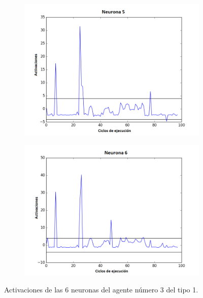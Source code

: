 \begin{figure}[!h]
\begin{subfigure}{0.33\textwidth}
  \includegraphics[width=\linewidth]{Imagenes/Agente1Activaciones/Agente2/Neurona4}
\end{subfigure}\hfil %
\begin{subfigure}{0.33\textwidth}
  \includegraphics[width=\linewidth]{Imagenes/Agente1Activaciones/Agente2/Neurona5}
\end{subfigure}
\caption{Activaciones de las 6 neuronas del agente número 3 del tipo 1.}
\end{figure}

